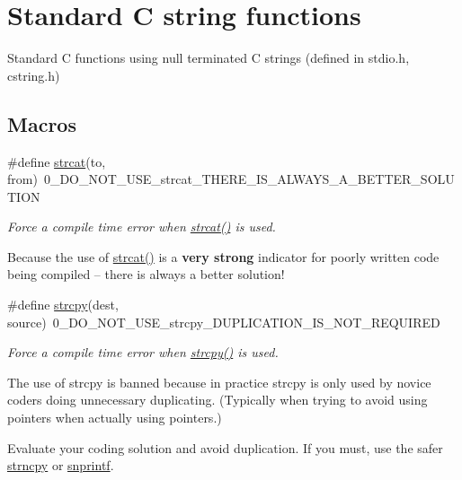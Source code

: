 \hypertarget{group__string}{\section{Standard C string functions}
\label{group__string}
}


Standard C functions using null terminated C strings (defined in stdio.\-h, cstring.\-h)  


\subsection*{Macros}
\begin{DoxyCompactItemize}
\item 
\#define \hyperlink{group__string_ga581a58e8b46f29e43d10a1fe668341b6}{strcat}(to, from)~0\-\_\-\-D\-O\-\_\-\-N\-O\-T\-\_\-\-U\-S\-E\-\_\-strcat\-\_\-\-T\-H\-E\-R\-E\-\_\-\-I\-S\-\_\-\-A\-L\-W\-A\-Y\-S\-\_\-\-A\-\_\-\-B\-E\-T\-T\-E\-R\-\_\-\-S\-O\-L\-U\-T\-I\-O\-N
\begin{DoxyCompactList}\small\item\em Force a compile time error when \hyperlink{group__string_ga581a58e8b46f29e43d10a1fe668341b6}{strcat()} is used. \par
 Because the use of \hyperlink{group__string_ga581a58e8b46f29e43d10a1fe668341b6}{strcat()} is a {\bfseries very strong} indicator for poorly written code being compiled -- there is always a better solution! \end{DoxyCompactList}\item 
\#define \hyperlink{group__string_ga706d50b003f763278d0cc4a14202a3fc}{strcpy}(dest, source)~0\-\_\-\-D\-O\-\_\-\-N\-O\-T\-\_\-\-U\-S\-E\-\_\-strcpy\-\_\-\-D\-U\-P\-L\-I\-C\-A\-T\-I\-O\-N\-\_\-\-I\-S\-\_\-\-N\-O\-T\-\_\-\-R\-E\-Q\-U\-I\-R\-E\-D
\begin{DoxyCompactList}\small\item\em Force a compile time error when \hyperlink{group__string_ga706d50b003f763278d0cc4a14202a3fc}{strcpy()} is used. \par
 The use of strcpy is banned because in practice strcpy is only used by novice coders doing unnecessary duplicating. (Typically when trying to avoid using pointers when actually using pointers.) \par
 Evaluate your coding solution and avoid duplication. If you must, use the safer \hyperlink{group__string_gac25b4990403370b02ac7f8403a6b3230}{strncpy} or \hyperlink{group__string_gac9626ce5468b43d954c3598c1ffe9725}{snprintf}. \end{DoxyCompactList}\end{DoxyCompactItemize}
